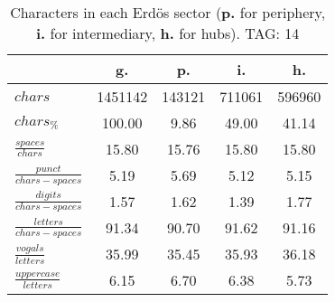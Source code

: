 \begin{table}[h!]
\begin{center}
\begin{tabular}{| l | c | c | c | c |}\hline
 & g. & p. & i. & h. \\\hline
$chars$ & 1451142  & 143121  & 711061  & 596960 \\\hline
$chars_{\%}$ & 100.00  & 9.86  & 49.00  & 41.14 \\\hline
$\frac{spaces}{chars}$ & 15.80  & 15.76  & 15.80  & 15.80 \\\hline
$\frac{punct}{chars-spaces}$ & 5.19  & 5.69  & 5.12  & 5.15 \\\hline
$\frac{digits}{chars-spaces}$ & 1.57  & 1.62  & 1.39  & 1.77 \\\hline
$\frac{letters}{chars-spaces}$ & 91.34  & 90.70  & 91.62  & 91.16 \\\hline
$\frac{vogals}{letters}$ & 35.99  & 35.45  & 35.93  & 36.18 \\\hline
$\frac{uppercase}{letters}$ & 6.15  & 6.70  & 6.38  & 5.73 \\\hline
\end{tabular}
\caption{Characters in each Erd\"os sector ({{\bf p.}} for periphery, {{\bf i.}} for intermediary, 
    {{\bf h.}} for hubs). TAG: 14}
\end{center}
\end{table}